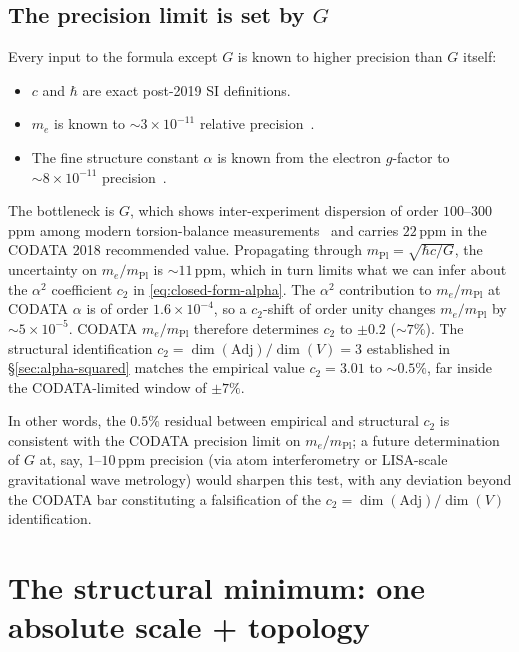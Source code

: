\documentclass[11pt]{article}
\newcommand{\Adj}{\mathrm{Adj}}
\newcommand{\mPl}{m_{\mathrm{Pl}}}
\begin{document}
\subsection{The precision limit is set by $G$}
\label{sec:closed-precision-limit}

Every input to the formula except $G$ is known to higher precision
than $G$ itself:

\begin{itemize}
\item $c$ and $\hbar$ are exact post-2019 SI definitions.
\item $m_e$ is known to $\sim 3\times 10^{-11}$ relative
  precision~\cite{codata2018}.
\item The fine structure constant $\alpha$ is known from the
  electron $g$-factor to $\sim 8\times 10^{-11}$
  precision~\cite{codata2018}.
\end{itemize}

\noindent
The bottleneck is $G$, which shows inter-experiment dispersion of
order $100$--$300$\,ppm among modern torsion-balance
measurements~\cite{rosi2014,tu2010} and carries $22$\,ppm in the
CODATA 2018 recommended value.  Propagating through
$\mPl = \sqrt{\hbar c / G}$, the uncertainty on $m_e/\mPl$ is
$\sim 11$\,ppm, which in turn limits what we can infer about the
$\alpha^2$ coefficient $c_2$ in \eqref{eq:closed-form-alpha}.  The
$\alpha^2$ contribution to $m_e/\mPl$ at CODATA $\alpha$ is of
order $1.6\times 10^{-4}$, so a $c_2$-shift of order unity
changes $m_e/\mPl$ by $\sim 5\times 10^{-5}$.  CODATA
$m_e/\mPl$ therefore determines $c_2$ to $\pm 0.2$ (${\sim}7\%$).
The structural identification $c_2 = \dim(\Adj)/\dim(V) = 3$
established in \S\ref{sec:alpha-squared} matches the empirical
value $c_2 = 3.01$ to ${\sim}0.5\%$, far inside the
CODATA-limited window of $\pm 7\%$.

In other words, the $0.5\%$ residual between empirical and
structural $c_2$ is consistent with the CODATA precision limit on
$m_e/\mPl$; a future determination of $G$ at, say, $1$--$10$\,ppm
precision (via atom interferometry or LISA-scale gravitational
wave metrology) would sharpen this test, with any deviation beyond
the CODATA bar constituting a falsification of the
$c_2 = \dim(\Adj)/\dim(V)$ identification.

\section{The structural minimum: one absolute scale + topology}
\label{sec:structural-minimum}
\end{document}
